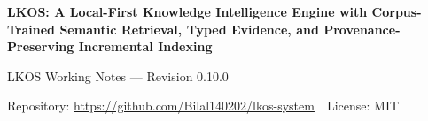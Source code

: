 
\begin{center}
  {\LARGE\bfseries LKOS: A Local-First Knowledge Intelligence Engine with
  Corpus-Trained Semantic Retrieval, Typed Evidence, and
  Provenance-Preserving Incremental Indexing\par}
  \vspace{1.0em}
  {\normalsize LKOS Working Notes --- Revision 0.10.0\par}
  \vspace{0.4em}
  {\small Repository: \url{https://github.com/Bilal140202/lkos-system}
  \,\textperiodcentered\, License: MIT\par}
\end{center}

\vspace{0.6em}


